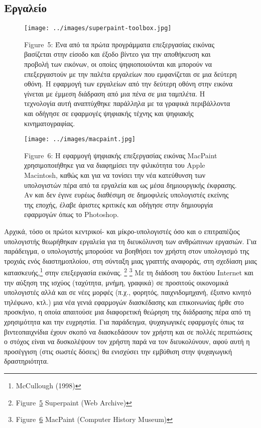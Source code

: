 \documentclass[
]{article}
\begin{document}
\hypertarget{ux3b5ux3c1ux3b3ux3b1ux3bbux3b5ux3afux3bf}{%
\subsection{Εργαλείο}\label{ux3b5ux3c1ux3b3ux3b1ux3bbux3b5ux3afux3bf}}

\leavevmode{}%
\begin{figure}
\hypertarget{fig:superpaint-toolbox}{%
\centering
\texttt{[image: ../images/superpaint-toolbox.jpg]}
\caption{Figure~5: Ένα από τα πρώτα προγράμματα επεξεργασίας εικόνας
βασίζεται στην είσοδο και έξοδο βίντεο για την αποθήκευση και προβολή
των εικόνων, οι οποίες ψηφιοποιούνται και μπορούν να επεξεργαστούν με
την παλέτα εργαλείων που εμφανίζεται σε μια δεύτερη οθόνη. Η εφαρμογή
των εργαλείων από την δεύτερη οθόνη στην εικόνα γίνεται με έμμεση
διάδραση από μια πένα σε μια ταμπλέτα. Η τεχνολογία αυτή αναπτύχθηκε
παράλληλα με τα γραφικά περιβάλλοντα και οδήγησε σε εφαρμογές ψηφιακής
τέχνης και ψηφιακής κινηματογραφίας.}\label{fig:superpaint-toolbox}
}
\end{figure}

\leavevmode{}%
\begin{figure}
\hypertarget{fig:macpaint}{%
\centering
\texttt{[image: ../images/macpaint.jpg]}
\caption{Figure~6: Η εφαρμογή ψηφιακής επεξεργασίας εικόνας MacPaint
χρησιμοποιήθηκε για να διαφημίσει την φιλικότητα του Apple Macintosh,
καθώς και για να τονίσει την νέα κατεύθυνση των υπολογιστών πέρα από τα
εργαλεία και ως μέσα δημιουργικής έκφρασης. Αν και δεν έγινε ευρέως
διαθέσιμη σε δημοφιλείς υπολογιστές εκείνης της εποχής, έλαβε άριστες
κριτικές και οδήγησε στην δημιουργία εφαρμογών όπως το
Photoshop.}\label{fig:macpaint}
}
\end{figure}

Αρχικά, τόσο οι πρώτοι κεντρικοί- και μίκρο-υπολογιστές όσο και ο
επιτραπέζιος υπολογιστής θεωρήθηκαν εργαλεία για τη διευκόλυνση των
ανθρώπινων εργασιών. Για παράδειγμα, ο υπολογιστής μπορούσε να βοηθήσει
τον χρήστη στον υπολογισμό της τροχιάς ενός διαστημοπλοίου, στη σύνταξη
μιας γραπτής αναφοράς, στη σχεδίαση μιας κατασκευής,\footnote{McCullough
  (1998)} στην επεξεργασία εικόνας. \footnote{Figure~\protect\hyperlink{fig:superpaint-toolbox}{5}
  Superpaint (Web Archive)} \footnote{Figure~\protect\hyperlink{fig:macpaint}{6}
  MacPaint (Computer History Museum)} Με τη διάδοση του δικτύου Internet
και την αύξηση της ισχύος (ταχύτητα, μνήμη, γραφικά) σε προσιτούς
οικονομικά υπολογιστές αλλά και σε νέες μορφές (π.χ., φορητός,
παιχνιδομηχανή, έξυπνο κινητό τηλέφωνο, κτλ.) μια νέα γενιά εφαρμογών
διασκέδασης και επικοινωνίας ήρθε στο προσκήνιο, η οποία απαιτούσε μια
διαφορετική θεώρηση της διάδρασης πέρα από τη χρησιμότητα και την
ευχρηστία. Για παράδειγμα, ψυχαγωγικές εφαρμογές όπως τα βιντεοπαιχνίδια
έχουν σκοπό να διασκεδάσουν τον χρήστη και σε πολλές περιπτώσεις ο
στόχος είναι να δυσκολέψουν τον χρήστη παρά να τον διευκολύνουν, αφού
αυτή η προσέγγιση (στις σωστές δόσεις) θα ενισχύσει την εμβύθιση στην
ψυχαγωγική δραστηριότητα.
\end{document}
